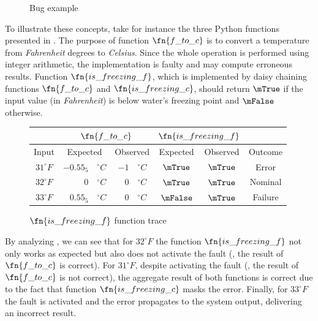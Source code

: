 \begin{figure}[h!]
  
  \caption{Bug example\label{fig:bugexample}}
\end{figure}

To illustrate these concepts, take for instance the three Python
functions presented in .
%
The purpose of function $\fn{f\_to\_c}$ is to convert a temperature
from \textit{Fahrenheit} degrees to \textit{Celsius}.
%
Since the whole operation is performed using integer arithmetic, the
implementation is faulty and may compute erroneous results.
%
Function $\fn{is\_freezing\_f}$, which is implemented by daisy
chaining functions $\fn{f\_to\_c}$ and $\fn{is\_freezing\_c}$, should
return $\mTrue$ if the input value (in \textit{Fahrenheit}) is
below water's freezing point and $\mFalse$ otherwise.

\begin{figure}[!ht]
  \begin{tabular}{c|r@{}@{}lr@{}l|cc|c}
    \multicolumn{1}{c|}{} & \multicolumn{4}{c|}{$\fn{f\_to\_c}$} & \multicolumn{2}{c|}{$\fn{is\_freezing\_f}$}                                                           \\
    \hline
    Input                 & \multicolumn{2}{c}{Expected}         & \multicolumn{2}{c|}{Observed} & Expected & Observed    & Outcome                                      \\
    \hline
    $31^{\circ} F$        & $-0.55_{5}$                          & $^{\circ}C$                   & $-1$     & $^{\circ}C$ & $\mTrue$  & $\mTrue$ & Error   \\
    $32^{\circ} F$        & $0$                                  & $^{\circ}C$                   & $0$      & $^{\circ}C$ & $\mTrue$  & $\mTrue$ & Nominal \\
    $33^{\circ} F$        & $0.55_{5}$                           & $^{\circ}C$                   & $0$      & $^{\circ}C$ & $\mFalse$ & $\mTrue$ & Failure \\
  \end{tabular}

  \caption{$\fn{is\_freezing\_f}$ function trace\label{tab:trace}}
\end{figure}
By analyzing , we can see that for $32^\circ F$ the
function \textit{$\fn{is\_freezing\_f}$} not only works as expected
but also does not activate the fault (\ie, the result of
$\fn{f\_to\_c}$ is correct).
%
For $31^\circ F$, despite activating the fault (\ie, the result of
$\fn{f\_to\_c}$ is not correct), the aggregate result of both
functions is correct due to the fact that function
$\fn{is\_freezing\_c}$ masks the error.
%
Finally, for $33^\circ F$ the fault is activated and the error
propagates to the system output, delivering an incorrect result.

